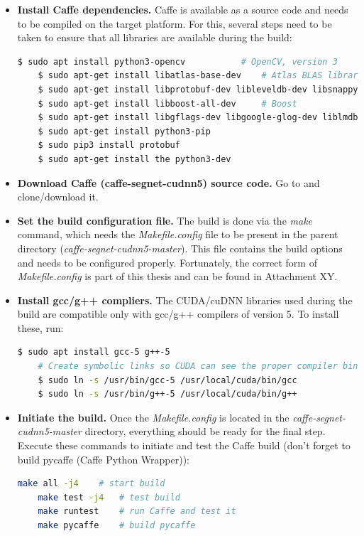 \begin{itemize}
		
	\item \textbf{Install Caffe dependencies.} Caffe is available as a source code and needs to be compiled on the target platform. For this, several steps need to be taken to ensure that all libraries are available during the build: \cite{caffe}
	
	\begin{lstlisting}[language=bash]
	$ sudo apt install python3-opencv 			# OpenCV, version 3
	$ sudo apt-get install libatlas-base-dev 	# Atlas BLAS library
	$ sudo apt-get install libprotobuf-dev libleveldb-dev libsnappy-dev libopencv-dev libhdf5-serial-dev protobuf-compiler
	$ sudo apt-get install libboost-all-dev		# Boost
	$ sudo apt-get install libgflags-dev libgoogle-glog-dev liblmdb-dev
	$ sudo apt-get install python3-pip
	$ sudo pip3 install protobuf
	$ sudo apt-get install the python3-dev
	\end{lstlisting}
	
	\item \textbf{Download Caffe (caffe-segnet-cudnn5) source code.} Go to \cite{filip_github_caffe} and clone/download it. 
	\item \textbf{Set the build configuration file.} The build is done via the \textit{make} command, which needs the \textit{Makefile.config} file to be present in the parent directory (\textit{caffe-segnet-cudnn5-master}). This file contains the build options and needs to be configured properly. Fortunately, the correct form of \textit{Makefile.config} is part of this thesis and can be found in Attachment XY. 
	
	\item \textbf{Install gcc/g++ compliers.} The CUDA/cuDNN libraries used during the build are compatible only with gcc/g++ compilers of version 5. To install these, run:
	
	\begin{lstlisting}[language=bash]
	$ sudo apt install gcc-5 g++-5
	# Create symbolic links so CUDA can see the proper compiler binaries
	$ sudo ln -s /usr/bin/gcc-5 /usr/local/cuda/bin/gcc
	$ sudo ln -s /usr/bin/g++-5 /usr/local/cuda/bin/g++
	\end{lstlisting}
	
	\item \textbf{Initiate the build.} Once the \textit{Makefile.config} is located in the \textit{caffe-segnet-cudnn5-master} directory, everything should be ready for the final step. Execute these commands to initiate and test the Caffe build (don't forget to build pycaffe (Caffe Python Wrapper)):
	
	\begin{lstlisting}[language=bash]
	make all -j4	# start build
	make test -j4	# test build
	make runtest	# run Caffe and test it
	make pycaffe	# build pycaffe 
	\end{lstlisting} 	
\end{itemize}





